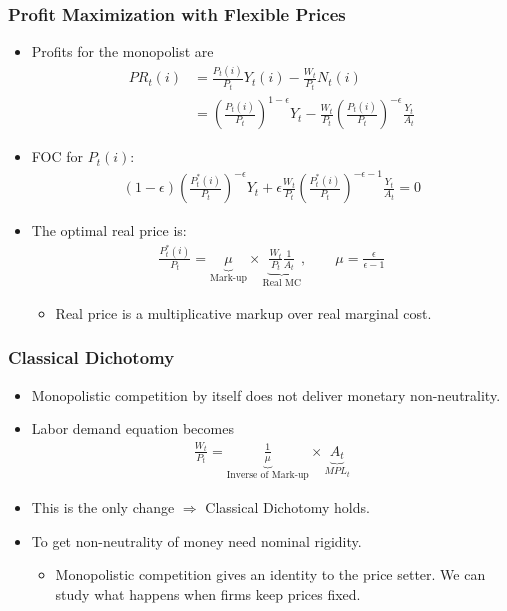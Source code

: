 \documentclass[english,xcolor=svgnames]{beamer}
\begin{document}
\begin{frame}
\frametitle{Profit Maximization with Flexible Prices}
\begin{itemize}
	\item Profits for the monopolist are
	\begin{align*}
		PR_t(i)&=\frac{P_t(i)}{P_t}Y_t(i) - \frac{W_t}{P_t}N_t(i)  \\
		&= \left(\frac{P_t(i)}{ P_t}\right)^{1-\epsilon}Y_t -\frac{W_t}{P_t}  \left(\frac{P_t(i)}{ P_t}\right)^{-\epsilon}  \frac{Y_t}{A_t}
	\end{align*}
	\item FOC for $P_t(i)$:
	\begin{align*}
		(1-\epsilon)\left(\frac{P_t^*(i)}{ P_t}\right)^{-\epsilon}Y_t + \epsilon\frac{W_t}{P_t}  \left(\frac{P_t^*(i)}{ P_t}\right)^{-\epsilon-1}  \frac{Y_t}{A_t} = 0
	\end{align*}
	\item The optimal real price is:
	\begin{align*}
		\frac{P_t^*(i)}{ P_t} = \underbrace{\mu}_{\text{Mark-up}} \times \underbrace{\frac{W_t}{P_t}\frac{1}{A_t}}_{\text{Real MC}},\qquad \mu = \frac{\epsilon}{\epsilon-1}
	\end{align*}
	\begin{itemize}
		\item Real price is a multiplicative markup over real marginal cost.
	\end{itemize}
\end{itemize}
\end{frame}

\begin{frame}
\frametitle{Classical Dichotomy}
\begin{itemize}
	\item Monopolistic competition by itself does not deliver monetary non-neutrality.
	\item Labor demand equation becomes
	\begin{align*}
		 \frac{W_t}{P_t} = \underbrace{\frac{1}{\mu}}_{\text{Inverse of Mark-up}} \times \underbrace{A_t}_{MPL_t}
	\end{align*}
	\item This is the only change $\Rightarrow$ Classical Dichotomy holds.
	\item To get non-neutrality of money need nominal rigidity.
	\begin{itemize}
		\item Monopolistic competition gives an identity to the price setter. We can study what happens when firms keep prices fixed.
	\end{itemize}
\end{itemize}
\end{frame}
\end{document}
